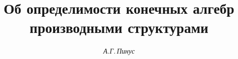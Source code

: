 

 


% 


 


\newcommand{\la}{\langle} 


\newcommand{\ra}{\rangle} 


\newcommand{\Sub}{\operatorname{Sub}} 


\newcommand{\Aut}{\operatorname{Aut}} 


\newcommand{\Iso}{\operatorname{Iso}} 


\newcommand{\End}{\operatorname{End}} 


\newcommand{\fin}{\operatorname{fin}} 


\newcommand{\tts}[1]{} 


 












 




\setcounter{page}{38} 












 


\author{\it А.Г.\,Пинус} 




\title{Об определимости конечных алгебр\\


производными структурами} 


